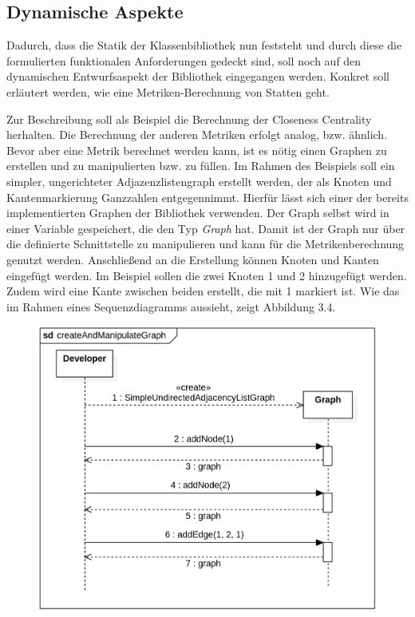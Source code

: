 \documentclass[a4paper,12pt,ngerman,chapterprefix=false,listof=totoc,bibliography=totoc]{scrreprt}
\begin{document}
{{\subsection{Dynamische Aspekte}
{
Dadurch, dass die Statik der Klassenbibliothek nun feststeht und durch diese die formulierten funktionalen Anforderungen gedeckt sind, soll noch auf den dynamischen Entwurfsaspekt der Bibliothek eingegangen werden. Konkret soll erläutert werden, wie eine Metriken-Berechnung von Statten geht.

Zur Beschreibung soll als Beispiel die Berechnung der Closeness Centrality herhalten. Die Berechnung der anderen Metriken erfolgt analog, bzw. ähnlich. Bevor aber eine Metrik berechnet werden kann, ist es nötig einen Graphen zu erstellen und zu manipulierten bzw. zu füllen. Im Rahmen des Beispiels soll ein simpler, ungerichteter Adjazenzlistengraph erstellt werden, der als Knoten und Kantenmarkierung Ganzzahlen entgegennimmt. Hierfür lässt sich einer der bereits implementierten Graphen der Bibliothek verwenden. Der Graph selbst wird in einer Variable gespeichert, die den Typ \textit{Graph} hat. Damit ist der Graph nur über die definierte Schnittstelle zu manipulieren und kann für die Metrikenberechnung genutzt werden. Anschließend an die Erstellung können Knoten und Kanten eingefügt werden. Im Beispiel sollen die zwei Knoten 1 und 2 hinzugefügt werden. Zudem wird eine Kante zwischen beiden erstellt, die mit 1 markiert ist. Wie das im Rahmen eines Sequenzdiagramms aussieht, zeigt Abbildung 3.4.
\begin{figure}[ht!]
	\centering
	\includegraphics[scale=.38]{Abbildungen/UML/sequence_graph_creation.png}

\end{figure}}}}
\end{document}
